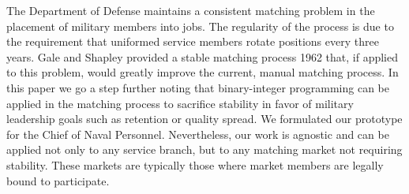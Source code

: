 The Department of Defense maintains a consistent matching problem in the placement of military members into jobs. The regularity of the process is due to the requirement that uniformed service members rotate positions every three years. Gale and Shapley provided a stable matching process 1962 that, if applied to this problem, would greatly improve the current, manual matching process. In this paper we go a step further noting that binary-integer programming can be applied in the matching process to sacrifice stability in favor of military leadership goals such as retention or quality spread. We formulated our prototype for the Chief of Naval Personnel. Nevertheless, our work is agnostic and can be applied not only to any service branch, but to any matching market not requiring stability. These markets are typically those where market members are legally bound to participate. 

